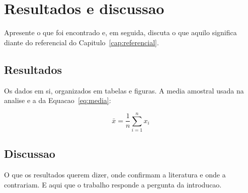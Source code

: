 \chapter{Resultados e discussao}
\label{cap:resultados}

Apresente o que foi encontrado e, em seguida, discuta o que aquilo significa
diante do referencial do Capitulo~\ref{cap:referencial}.

\section{Resultados}
\label{sec:resultados}

Os dados em si, organizados em tabelas e figuras. A media amostral usada na
analise e a da Equacao~\eqref{eq:media}:

\begin{equation}
  \label{eq:media}
  \bar{x} = \frac{1}{n} \sum_{i=1}^{n} x_i
\end{equation}

\section{Discussao}
\label{sec:discussao}

O que os resultados querem dizer, onde confirmam a literatura e onde a
contrariam. E aqui que o trabalho responde a pergunta da introducao.
